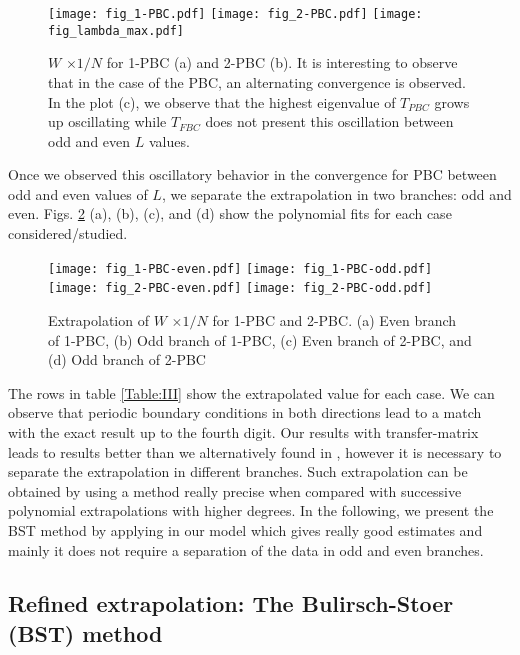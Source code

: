 \documentclass[3p, 10pt, onecolumn]{elsarticle}
\begin{document}
\begin{figure}[tbp]
\begin{center}
\texttt{[image: fig\_1-PBC.pdf]}%
\texttt{[image: fig\_2-PBC.pdf]} %
\texttt{[image: fig\_lambda\_max.pdf]}
\end{center}
\caption{$W$ $\times 1/N$ for 1-PBC (a) and 2-PBC (b). It is interesting to
observe that in the case of the PBC, an alternating convergence is observed.
In the plot (c), we observe that the highest eigenvalue of $T_{PBC}$ grows
up oscillating while $T_{FBC}$ does not present this oscillation between odd
and even $L$ values. }
\label{Fig:Alternate_PBC}
\end{figure}

Once we observed this oscillatory behavior in the convergence for PBC
between odd and even values of $L$, we separate the extrapolation in two
branches: odd and even. Figs. \ref{Fig:Branches} (a), (b), (c), and (d) show
the polynomial fits for each case considered/studied.

\begin{figure}[tbp]
\begin{center}
\texttt{[image: fig\_1-PBC-even.pdf]}%
\texttt{[image: fig\_1-PBC-odd.pdf]} %
\texttt{[image: fig\_2-PBC-even.pdf]}%
\texttt{[image: fig\_2-PBC-odd.pdf]}
\end{center}
\caption{Extrapolation of $W$ $\times 1/N$ for 1-PBC and 2-PBC. (a) Even
branch of 1-PBC, (b) Odd branch of 1-PBC, (c) Even branch of 2-PBC, and (d)
Odd branch of 2-PBC}
\label{Fig:Branches}
\end{figure}

The rows in table \ref{Table:III} show the extrapolated value for each case.
We can observe that periodic boundary conditions in both directions
lead to a match with the exact result up to the fourth digit. Our results
with transfer-matrix leads to results better than we alternatively found in 
\cite{rdasilvaEJP}, however it is necessary to separate the extrapolation in
different branches. Such extrapolation can be obtained by using a method
really precise when compared with successive polynomial extrapolations with
higher degrees. In the following, we present the BST method by applying in
our model which gives really good estimates and mainly it does not require a
separation of the data in odd and even branches.\textbf{\ }

\subsection{Refined extrapolation: The Bulirsch-Stoer (BST) method}
\end{document}

